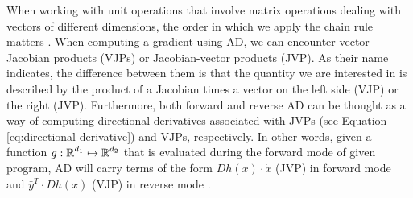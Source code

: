 When working with unit operations that involve matrix operations dealing with vectors of different dimensions, the order in which we apply the chain rule matters \cite{Giering_Kaminski_1998}.
When computing a gradient using AD, we can encounter vector-Jacobian products (VJPs) or Jacobian-vector products (JVP).
As their name indicates, the difference between them is that the quantity we are interested in is described by the product of a Jacobian times a vector on the left side (VJP) or the right (JVP).
Furthermore, both forward and reverse AD can be thought as a way of computing directional derivatives associated with JVPs (see Equation \eqref{eq:directional-derivative}) and VJPs, respectively. 
In other words, given a function $g: \operatorname{\mathbb{R}}^{d_1} \mapsto \operatorname{\mathbb{R}}^{d_2}$ that is evaluated during the forward mode of given program, AD will carry terms of the form $Dh (x) \cdot \dot x$ (JVP) in forward mode and $\bar y^T \cdot Dh (x)$ (VJP) in reverse mode \cite{Griewank:2008kh}.

